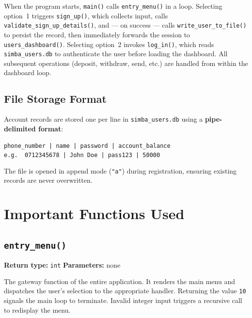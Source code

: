 \documentclass[12pt, a4paper]{article}
\begin{document}
When the program starts, \texttt{main()} calls \texttt{entry\_menu()} in a loop. Selecting
option~1 triggers \texttt{sign\_up()}, which collects input, calls
\texttt{validate\_sign\_up\_details()}, and — on success — calls
\texttt{write\_user\_to\_file()} to persist the record, then immediately forwards the session
to \texttt{users\_dashboard()}. Selecting option~2 invokes \texttt{log\_in()}, which reads
\texttt{simba\_users.db} to authenticate the user before loading the dashboard. All
subsequent operations (deposit, withdraw, send, etc.) are handled from within the
dashboard loop.

\subsection{File Storage Format}

Account records are stored one per line in \texttt{simba\_users.db} using a
\textbf{pipe-delimited format}:

\begin{mdframed}[backgroundcolor=codeGray, linecolor=black,
                 linewidth=0.8pt, innerleftmargin=10pt, innerrightmargin=10pt,
                 innertopmargin=8pt, innerbottommargin=8pt]
\texttt{phone\_number | name | password | account\_balance}\\
\texttt{e.g.\ \ 0712345678 | John Doe | pass123 | 50000}
\end{mdframed}

The file is opened in append mode (\texttt{"a"}) during registration, ensuring existing
records are never overwritten.

\section{Important Functions Used}

\subsection{\texttt{entry\_menu()}}

\textbf{Return type:} \texttt{int} \quad \textbf{Parameters:} none

The gateway function of the entire application. It renders the main menu and dispatches
the user's selection to the appropriate handler. Returning the value \texttt{10} signals the
main loop to terminate. Invalid integer input triggers a recursive call to redisplay the menu.
\end{document}
